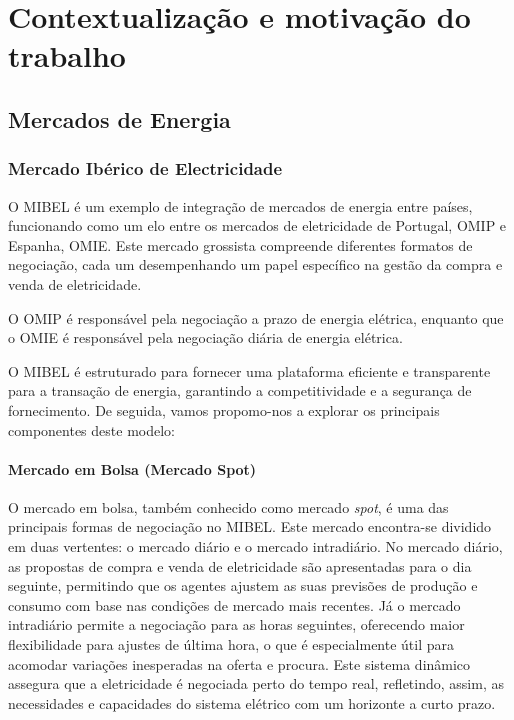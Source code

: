 \section{Contextualização e motivação do trabalho\label{ch:contextos}}

\subsection{Mercados de Energia}

\subsubsection{Mercado Ibérico de Electricidade \label{se:mibel}}

O \gls{MIBEL} é um exemplo de integração de mercados de energia entre países, funcionando como um elo entre os mercados de eletricidade de Portugal, \gls{OMIP} e Espanha, \gls{OMIE}. Este mercado grossista compreende diferentes formatos de negociação, cada um desempenhando um papel específico na gestão da compra e venda de eletricidade.\par
O \gls{OMIP} é responsável pela negociação a prazo de energia elétrica, enquanto que o \gls{OMIE} é responsável pela negociação diária de energia elétrica.\par
O \gls{MIBEL} é estruturado para fornecer uma plataforma eficiente e transparente para a transação de energia, garantindo a competitividade e a segurança de fornecimento. De seguida, vamos propomo-nos a explorar os principais componentes deste modelo:\par


\paragraph{Mercado em Bolsa (Mercado Spot) \label{se:mercado_bolsa}}
\text{ }  \par
O mercado em bolsa, também conhecido como mercado \textit{spot}, é uma das principais formas de negociação no \gls{MIBEL}. Este mercado encontra-se dividido em duas vertentes: o mercado diário e o mercado intradiário. No mercado diário, as propostas de compra e venda de eletricidade são apresentadas para o dia seguinte, permitindo que os agentes ajustem as suas previsões de produção e consumo com base nas condições de mercado mais recentes. Já o mercado intradiário permite a negociação para as horas seguintes, oferecendo maior flexibilidade para ajustes de última hora, o que é especialmente útil para acomodar variações inesperadas na oferta e procura. Este sistema dinâmico assegura que a eletricidade é negociada perto do tempo real, refletindo, assim, as necessidades e capacidades do sistema elétrico com um horizonte a curto prazo.\par


